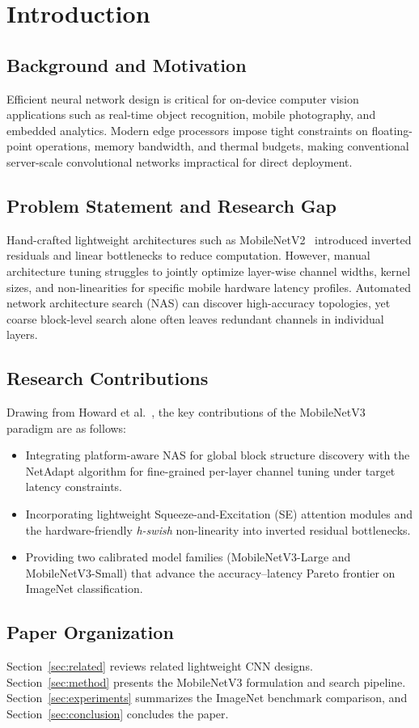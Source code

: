 \section{Introduction}\label{sec:intro}
\subsection{Background and Motivation}
Efficient neural network design is critical for on-device computer vision applications such as real-time object recognition, mobile photography, and embedded analytics.
Modern edge processors impose tight constraints on floating-point operations, memory bandwidth, and thermal budgets, making conventional server-scale convolutional networks impractical for direct deployment.

\subsection{Problem Statement and Research Gap}
Hand-crafted lightweight architectures such as MobileNetV2~\cite{sandler2018mobilenetv2} introduced inverted residuals and linear bottlenecks to reduce computation.
However, manual architecture tuning struggles to jointly optimize layer-wise channel widths, kernel sizes, and non-linearities for specific mobile hardware latency profiles.
Automated network architecture search (NAS) can discover high-accuracy topologies, yet coarse block-level search alone often leaves redundant channels in individual layers.

\subsection{Research Contributions}
Drawing from Howard et al.~\cite{howard2019mobilenetv3}, the key contributions of the MobileNetV3 paradigm are as follows:
\begin{itemize}
\item Integrating platform-aware NAS for global block structure discovery with the NetAdapt algorithm for fine-grained per-layer channel tuning under target latency constraints.
\item Incorporating lightweight Squeeze-and-Excitation (SE) attention modules and the hardware-friendly \textit{h-swish} non-linearity into inverted residual bottlenecks.
\item Providing two calibrated model families (MobileNetV3-Large and MobileNetV3-Small) that advance the accuracy--latency Pareto frontier on ImageNet classification.
\end{itemize}

\subsection{Paper Organization}
Section~\ref{sec:related} reviews related lightweight CNN designs. Section~\ref{sec:method} presents the MobileNetV3 formulation and search pipeline. Section~\ref{sec:experiments} summarizes the ImageNet benchmark comparison, and Section~\ref{sec:conclusion} concludes the paper.

